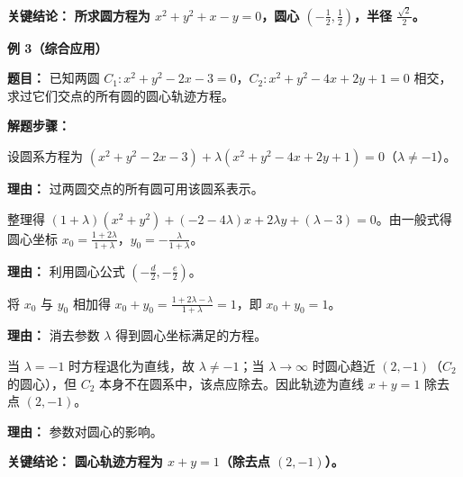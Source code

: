 \begin{examplebox}
	\textbf{\textcolor{CExample}{关键结论：}}
	\textbf{所求圆方程为 $x^2+y^2+x-y=0$，圆心 $(-\frac12,\frac12)$，半径 $\frac{\sqrt2}{2}$。}

	\medskip
	\textbf{\textcolor{CExample}{例 3（综合应用）}}

	\textbf{\textcolor{CExample}{题目：}}
	已知两圆 $C_1: x^2+y^2-2x-3=0$，$C_2: x^2+y^2-4x+2y+1=0$ 相交，求过它们交点的所有圆的圆心轨迹方程。

	\textbf{\textcolor{CExample}{解题步骤：}}
	\begin{description}[style=nextline, leftmargin=2.8em, labelsep=0.5em, itemsep=0.45em]
		\item[\textbf{第一步（设圆系方程）：}] 设圆系方程为 $(x^2+y^2-2x-3)+\lambda(x^2+y^2-4x+2y+1)=0$（$\lambda\neq -1$）。
			\par\textbf{理由：} 过两圆交点的所有圆可用该圆系表示。
		\item[\textbf{第二步（求圆心坐标）：}] 整理得 $(1+\lambda)(x^2+y^2)+(-2-4\lambda)x+2\lambda y+(\lambda-3)=0$。由一般式得圆心坐标 $x_0=\frac{1+2\lambda}{1+\lambda}$，$y_0=-\frac{\lambda}{1+\lambda}$。
			\par\textbf{理由：} 利用圆心公式 $(-\frac{d}{2},-\frac{e}{2})$。
		\item[\textbf{第三步（消参得关系）：}] 将 $x_0$ 与 $y_0$ 相加得 $x_0+y_0 = \frac{1+2\lambda-\lambda}{1+\lambda}=1$，即 $x_0+y_0=1$。
			\par\textbf{理由：} 消去参数 $\lambda$ 得到圆心坐标满足的方程。
		\item[\textbf{第四步（讨论范围）：}] 当 $\lambda=-1$ 时方程退化为直线，故 $\lambda\neq -1$；当 $\lambda\to\infty$ 时圆心趋近 $(2,-1)$（$C_2$ 的圆心），但 $C_2$ 本身不在圆系中，该点应除去。因此轨迹为直线 $x+y=1$ 除去点 $(2,-1)$。
			\par\textbf{理由：} 参数对圆心的影响。
	\end{description}

	\textbf{\textcolor{CExample}{关键结论：}}
	\textbf{圆心轨迹方程为 $x+y=1$（除去点 $(2,-1)$）。}
\end{examplebox}
